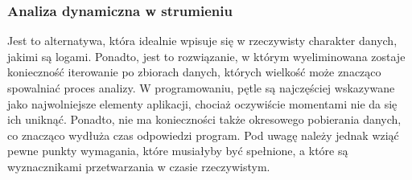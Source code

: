     \subsubsection{Analiza dynamiczna w strumieniu}
    \label{chapter:application:plans:alarm_on_logs:streaming}
    Jest to alternatywa, która idealnie wpisuje się w rzeczywisty charakter danych, jakimi są logami. Ponadto, jest to rozwiązanie, w którym
    wyeliminowana zostaje konieczność iterowanie po zbiorach danych, których wielkość może znacząco spowalniać proces analizy. W programowaniu,
    pętle są najczęściej wskazywane jako najwolniejsze elementy aplikacji, chociaż oczywiście momentami nie da się ich uniknąć. Ponadto, nie ma 
    konieczności także okresowego pobierania danych, co znacząco wydłuża czas odpowiedzi program. Pod uwagę należy jednak wziąć pewne punkty wymagania,
    które musiałyby być spełnione, a które są wyznacznikami przetwarzania w czasie rzeczywistym.
